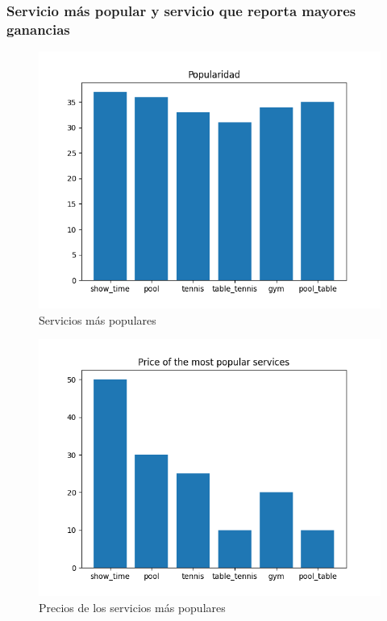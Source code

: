 \documentclass[12pt,a4paper]{article} \usepackage[spanish]{babel} \usepackage{graphicx} \usepackage{amsmath} \usepackage{amsfonts} \usepackage{amssymb} \usepackage{float} \usepackage{geometry}
\begin{document}
\subsubsection{Servicio más popular y servicio que reporta mayores ganancias}
\begin{figure}[H] \centering \includegraphics[width=\textwidth]{Popularidad serv} \caption{Servicios más populares} \label{fig:etiqueta} \end{figure}
\begin{figure}[H] \centering \includegraphics[width=\textwidth]{precio popularidad} \caption{Precios de los servicios más populares} \label{fig:etiqueta} \end{figure}
\end{document}
